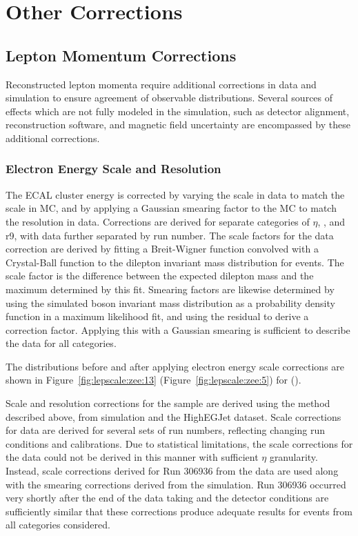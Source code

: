 \chapter{Other Corrections}\label{ch:corrs}
\section{Lepton Momentum Corrections}
Reconstructed lepton momenta require additional corrections in data and simulation to ensure agreement of observable distributions. Several sources of effects which are not fully modeled in the simulation, such as detector alignment, reconstruction software, and magnetic field uncertainty are encompassed by these additional corrections. 
\subsection{Electron Energy Scale and Resolution}
The ECAL cluster energy is corrected by varying the scale in data to match the scale in MC, and by applying a Gaussian smearing factor to the MC to match the resolution in data. Corrections are derived for separate categories of $\eta$, \et, and r9, with data further separated by run number. The scale factors for the data correction are derived by fitting a Breit-Wigner function convolved with a Crystal-Ball function to the dilepton invariant mass distribution for \zee events. The scale factor is the difference between the expected dilepton mass and the maximum determined by this fit. Smearing factors are likewise determined by using the simulated \Z boson invariant mass distribution as a probability density function in a maximum likelihood fit, and using the residual to derive a correction factor. Applying this with a Gaussian smearing is sufficient to describe the data for all categories\cite{Khachatryan:2015iwa}.

The \mll distributions before and after applying electron energy scale corrections are shown in Figure~\ref{fig:lepscale:zee:13} (Figure~\ref{fig:lepscale:zee:5}) for \serah (\serag). 




Scale and resolution corrections for the \serah sample are derived using the method described above, from \zll simulation and the HighEGJet dataset. Scale corrections for data are derived for several sets of run numbers, reflecting changing run conditions and calibrations. Due to statistical limitations, the scale corrections for the \serag data could not be derived in this manner with sufficient $\eta$ granularity. Instead, scale corrections derived for Run 306936 from the \serah data are used along with the smearing corrections derived from the \serah simulation. Run 306936 occurred very shortly after the end of the \serag data taking and the detector conditions are sufficiently similar that these corrections produce adequate results for events from all categories considered.

